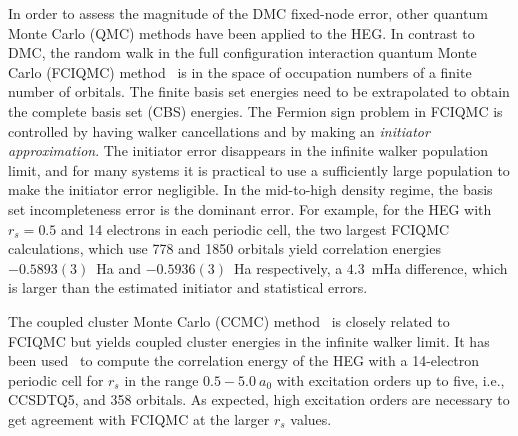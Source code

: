 
In order to assess the magnitude of the DMC fixed-node error, other quantum Monte Carlo (QMC) methods
have been applied to the HEG.
In contrast to DMC, the random walk in the full configuration interaction quantum Monte Carlo (FCIQMC)
method~\cite{BooThoAla-JCP-09,CleBooAla-JCP-10,SheBooGruAla-PRB-12,SheBooGruAla-PRB-12} is in the space of
occupation numbers of a finite number of orbitals.
The finite basis set energies need to be extrapolated to obtain the complete basis set (CBS) energies.
The Fermion sign problem in FCIQMC is controlled by having walker cancellations and by making an {\it initiator approximation}.
The initiator error disappears in the infinite walker population limit, and for many systems it is practical
to use a sufficiently large population to make the initiator error negligible.
In the mid-to-high density regime, the basis set incompleteness error is the dominant error.
For example, for the HEG with $r_s=0.5$ and 14 electrons in each periodic cell, the two largest FCIQMC
calculations, which use 778 and 1850 orbitals yield correlation energies $-0.5893(3)$~Ha and $-0.5936(3)$~Ha
respectively, a $4.3$~mHa difference, which is larger than the estimated initiator and statistical errors.

The coupled cluster Monte Carlo (CCMC) method~\cite{neufeld2017study} is closely related
to FCIQMC but yields coupled cluster energies in the infinite walker limit.
It has been used~\cite{neufeld2017study} to compute the correlation energy of the HEG with a 14-electron periodic cell for
$r_s$ in the range $0.5 - 5.0\ a_0$ with excitation orders up to five, i.e., CCSDTQ5, and 358 orbitals.
As expected, high excitation orders are necessary to get agreement with FCIQMC at the larger $r_s$ values.

